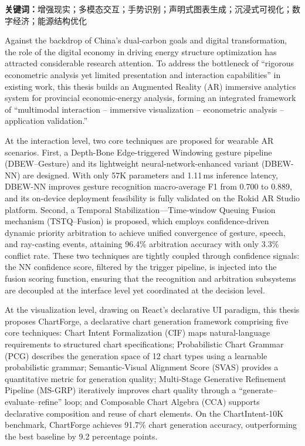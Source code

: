 \textbf{关键词：}增强现实；多模态交互；手势识别；声明式图表生成；沉浸式可视化；数字经济；能源结构优化


Against the backdrop of China's dual-carbon goals and digital transformation, the role of the digital economy in driving energy structure optimization has attracted considerable research attention. To address the bottleneck of “rigorous econometric analysis yet limited presentation and interaction capabilities” in existing work, this thesis builds an Augmented Reality (AR) immersive analytics system for provincial economic-energy analysis, forming an integrated framework of “multimodal interaction -- immersive visualization -- econometric analysis -- application validation.”

At the interaction level, two core techniques are proposed for wearable AR scenarios. First, a Depth-Bone Edge-triggered Windowing gesture pipeline (DBEW--Gesture) and its lightweight neural-network-enhanced variant (DBEW-NN) are designed. With only 57K parameters and 1.11\,ms inference latency, DBEW-NN improves gesture recognition macro-average F1 from 0.700 to 0.889, and its on-device deployment feasibility is fully validated on the Rokid AR Studio platform. Second, a Temporal Stabilization---Time-window Queuing Fusion mechanism (TSTQ--Fusion) is proposed, which employs confidence-driven dynamic priority arbitration to achieve unified convergence of gesture, speech, and ray-casting events, attaining 96.4\% arbitration accuracy with only 3.3\% conflict rate. These two techniques are tightly coupled through confidence signals: the NN confidence score, filtered by the trigger pipeline, is injected into the fusion scoring function, ensuring that the recognition and arbitration subsystems are decoupled at the interface level yet coordinated at the decision level.

At the visualization level, drawing on React's declarative UI paradigm, this thesis proposes ChartForge, a declarative chart generation framework comprising five core techniques: Chart Intent Formalization (CIF) maps natural-language requirements to structured chart specifications; Probabilistic Chart Grammar (PCG) describes the generation space of 12 chart types using a learnable probabilistic grammar; Semantic-Visual Alignment Score (SVAS) provides a quantitative metric for generation quality; Multi-Stage Generative Refinement Pipeline (MS-GRP) iteratively improves chart quality through a “generate--evaluate--refine” loop; and Composable Chart Algebra (CCA) supports declarative composition and reuse of chart elements. On the ChartIntent-10K benchmark, ChartForge achieves 91.7\% chart generation accuracy, outperforming the best baseline by 9.2 percentage points.

